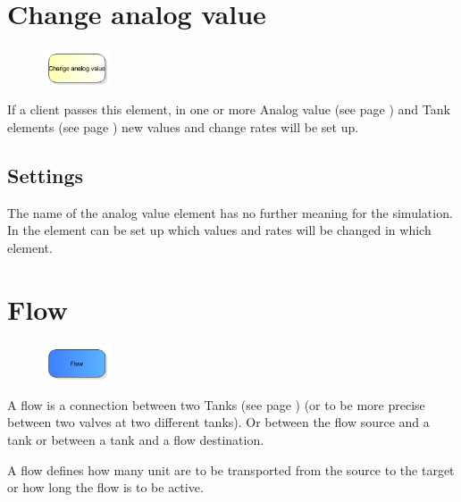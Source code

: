 \section{Change analog value}
\label{ref:ModelElementAnalogAssign}

\begin{figure}
\vspace{-22pt}
\includegraphics[width=2cm]{imageModelElementAnalogAssign.png}
\vspace{-22pt}
\end{figure}

If a client passes this element, in one or more
Analog value (see page \pageref{ref:ModelElementAnalogValue}) and
Tank elements (see page \pageref{ref:ModelElementTank}) 
new values and change rates will be set up.

\subsection*{Settings}

The name of the analog value element has no further meaning for the simulation.
In the element can be set up which values and rates will be changed in which element.


\section{Flow}
\label{ref:ModelElementTankFlowByClient}

\begin{figure}
\vspace{-22pt}
\includegraphics[width=2cm]{imageModelElementTankFlowByClient.png}
\vspace{-22pt}
\end{figure}

A flow is a connection between two Tanks (see page \pageref{ref:ModelElementTank}) 
(or to be more precise between two valves at two different tanks).
Or between the flow source and a tank or between a tank and a flow destination.

A flow defines how many unit are to be transported from the source to the target
or how long the flow is to be active.

